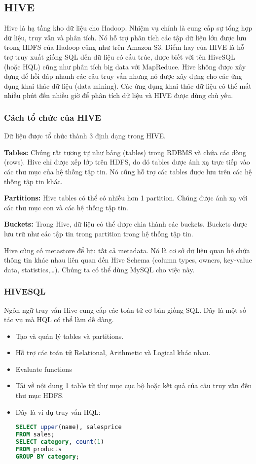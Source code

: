 \begin{itemize}
\end{itemize}
\subsection{HIVE}
Hive là hạ tầng kho dữ liệu cho Hadoop. Nhiệm vụ chính là cung cấp sự tổng hợp dữ liệu, truy vấn và phân tích. Nó hỗ trợ phân tích các tập dữ liệu lớn được lưu trong HDFS của Hadoop cũng như trên Amazon S3. Điểm hay của HIVE là hỗ trợ truy xuất giống SQL đến dữ liệu có cấu trúc, được biết với tên HiveSQL (hoặc HQL) cũng như phân tích big data với MapReduce. Hive không được xây dựng để hồi đáp nhanh các câu truy vấn nhưng nó được xây dựng cho các ứng dụng khai thác dữ liệu (data mining). Các ứng dụng khai thác dữ liệu có thể mất nhiều phút đến nhiều giờ để phân tích dữ liệu và HIVE được dùng chủ yếu.\par 
\subsubsection{Cách tổ chức của HIVE}
Dữ liệu được tổ chức thành 3 định dạng trong HIVE.\par

\textbf{Tables:} Chúng rất tương tự như bảng (tables) trong RDBMS và chứa các dòng (rows). Hive chỉ được xếp lớp trên HDFS, do đó tables được ánh xạ trực tiếp vào các thư mục của hệ thống tập tin. Nó cũng hỗ trợ các tables được lưu trên các hệ thống tập tin khác.\par

\textbf{Partitions:} Hive tables có thể có nhiều hơn 1 partition. Chúng được ánh xạ với các thư mục con và các hệ thống tập tin.\par

\textbf{Buckets:} Trong Hive, dữ liệu có thể được chia thành các buckets. Buckets được lưu trữ như các tập tin trong partition trong hệ thống tập tin.\par
Hive cũng có metastore để lưu tất cả metadata. Nó là cơ sở dữ liệu quan hệ chứa thông tin khác nhau liên quan đến Hive Schema (column types, owners, key-value data, statistics,…). Chúng ta có thể dùng MySQL cho việc này.
\subsubsection{HIVESQL}
Ngôn ngữ truy vấn Hive cung cấp các toán tử cơ bản giống SQL. Đây là một số tác vụ mà HQL có thể làm dễ dàng.
\begin{itemize}
	\item Tạo và quản lý tables và partitions.
	\item Hỗ trợ các toán tử Relational, Arithmetic và Logical khác nhau.
	\item Evaluate functions
	\item Tải về nội dung 1 table từ thư mục cục bộ hoặc kết quả của câu truy vấn đến thư mục HDFS.
	\item Đây là ví dụ truy vấn HQL:
	\begin{lstlisting}[language=SQL]
SELECT upper(name), salesprice 
FROM sales; 
SELECT category, count(1) 
FROM products 
GROUP BY category;

	\end{lstlisting}
\end{itemize}
